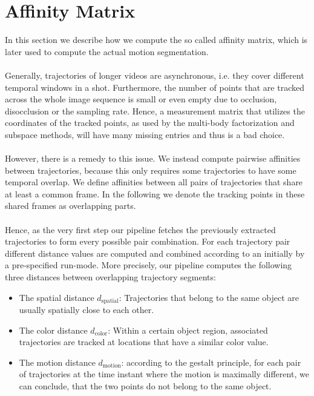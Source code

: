 \section{Affinity Matrix}
In this section we describe how we compute the so called affinity matrix, which is later used to compute the actual motion segmentation. \\ \\
Generally, trajectories of longer videos are asynchronous, i.e. they cover different temporal windows in a shot. Furthermore, the number of points that are tracked across the whole image sequence is small or even empty due to occlusion, disocclusion or the sampling rate. Hence, a measurement matrix that utilizes the coordinates of the tracked points, as used by the multi-body factorization and subspace methods, will have many missing entries and thus is a bad choice. \\ \\
However, there is a remedy to this issue. We instead compute pairwise affinities between trajectories, because this only requires some trajectories to have some temporal overlap. We define affinities between all pairs of trajectories that share at least a common frame. In the following we denote the tracking points in these shared frames as overlapping parts. \\ \\
Hence, as the very first step our pipeline fetches the previously extracted trajectories to form every possible pair combination. For each trajectory pair different distance values are computed and combined according to an initially by a pre-specified run-mode. More precisely, our pipeline computes the following three distances between overlapping trajectory segments:
\begin{itemize}
  \item The spatial distance $d_{\text{spatial}}$: Trajectories that belong to the same object are usually spatially close to each other.
  \item The color distance $d_{\text{color}}$: Within a certain object region, associated trajectories are tracked at locations that have a similar color value.
  \item The motion distance $d_{\text{motion}}$: according to the gestalt principle, for each pair of trajectories at the time instant where the motion is maximally different, we can conclude, that the two points do not belong to the same object.
\end{itemize}



